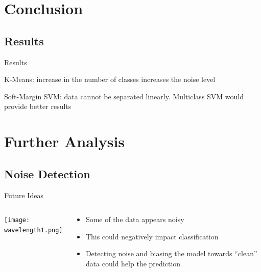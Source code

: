 \documentclass[11pt]{beamer}
\begin{document}

\section{Conclusion}
\subsection{Results}
\begin{frame}{Results}
\item K-Means: increase in the number of classes increases the noise level
\item Soft-Margin SVM: data cannot be separated linearly. Multiclass SVM would provide better results 
\end{frame}


\section{Further Analysis}
\subsection{Noise Detection}
\begin{frame}{Future Ideas}
\begin{columns}[T]
\begin{column}{.48\textwidth}
\texttt{[image: wavelength1.png]}
\end{column}
\hfill
\begin{column}{.48\textwidth}
\begin{itemize}
\item Some of the data appears noisy
\item This could negatively impact classification
\item Detecting noise and biasing the model towards ``clean'' data could help the prediction
\end{itemize}
\end{column}
\end{columns}
\end{frame}
\end{document}
